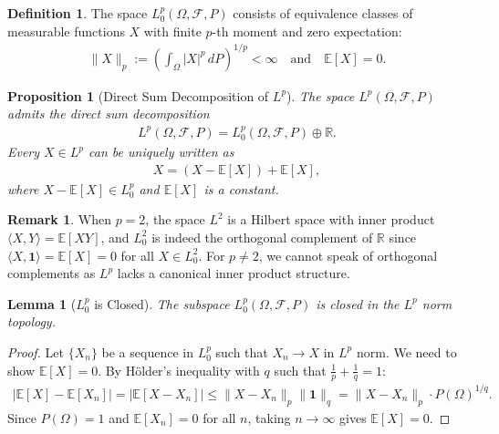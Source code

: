 \documentclass[11pt,reqno]{amsart}
\newtheorem{lemma}[theorem]{Lemma}
\newtheorem{proposition}[theorem]{Proposition}
\theoremstyle{definition}
\newtheorem{definition}[theorem]{Definition}
\newtheorem{remark}[theorem]{Remark}
\theoremstyle{remark}
\begin{document}
\begin{definition}
	The space \(L^p_0(\Omega, \mathcal{F}, P)\) consists of equivalence classes of measurable functions $X$ with finite $p$-th moment and zero expectation:
	\begin{align*}
		\|X\|_p := \left( \int_\Omega |X|^p \, dP \right)^{1/p} < \infty \quad \text{and} \quad \mathbb{E}[X] = 0.
	\end{align*}
\end{definition}

\begin{proposition}[Direct Sum Decomposition of $L^p$]
	The space $L^p(\Omega, \mathcal{F}, P)$ admits the direct sum decomposition
	\begin{align*}
		L^p(\Omega, \mathcal{F}, P) = L^p_0(\Omega, \mathcal{F}, P) \oplus \mathbb{R}.
	\end{align*}
	Every \(X \in L^p\) can be uniquely written as
	\begin{align*}
		X = (X - \mathbb{E}[X]) + \mathbb{E}[X],
	\end{align*}
	where \(X - \mathbb{E}[X] \in L^p_0\) and \(\mathbb{E}[X]\) is a constant.
\end{proposition}

\begin{remark}
	When $p = 2$, the space $L^2$ is a Hilbert space with inner product $\langle X, Y \rangle = \mathbb{E}[XY]$, and $L^2_0$ is indeed the orthogonal complement of \(\mathbb{R}\) since \(\langle X, \mathbf{1} \rangle = \mathbb{E}[X] = 0\) for all \(X \in L^2_0\). For \(p \neq 2\), we cannot speak of orthogonal complements as \(L^p\) lacks a canonical inner product structure.
\end{remark}

\begin{lemma}[$L^p_0$ is Closed]
	The subspace $L^p_0(\Omega, \mathcal{F}, P)$ is closed in the $L^p$ norm topology.
\end{lemma}

\begin{proof}
	Let $\{X_n\}$ be a sequence in $L^p_0$ such that $X_n \to X$ in $L^p$ norm. We need to show $\mathbb{E}[X] = 0$. By Hölder's inequality with $q$ such that $\frac{1}{p} + \frac{1}{q} = 1$:
	\begin{align*}
		|\mathbb{E}[X] - \mathbb{E}[X_n]| = |\mathbb{E}[X - X_n]| \leq \|X - X_n\|_p \|\mathbf{1}\|_q = \|X - X_n\|_p \cdot P(\Omega)^{1/q}.
	\end{align*}
	Since $P(\Omega) = 1$ and $\mathbb{E}[X_n] = 0$ for all $n$, taking $n \to \infty$ gives $\mathbb{E}[X] = 0$.
\end{proof}
\end{document}
